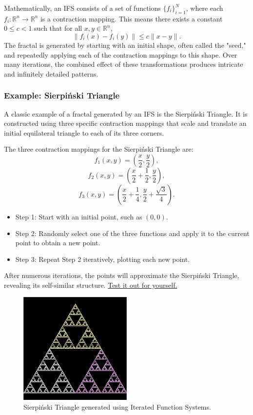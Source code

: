 \documentclass[12pt]{article}
\begin{document}
Mathematically, an IFS consists of a set of functions \( \{f_i\}_{i=1}^N \), where each \( f_i: \mathbb{R}^n \to \mathbb{R}^n \) is a contraction mapping. This means there exists a constant \( 0 \leq c < 1 \) such that for all \( x, y \in \mathbb{R}^n \),
\[
\| f_i(x) - f_i(y) \| \leq c \| x - y \|.
\]
The fractal is generated by starting with an initial shape, often called the "seed," and repeatedly applying each of the contraction mappings to this shape. Over many iterations, the combined effect of these transformations produces intricate and infinitely detailed patterns.

\subsubsection{Example: Sierpiński Triangle}
A classic example of a fractal generated by an IFS is the Sierpiński Triangle. It is constructed using three specific contraction mappings that scale and translate an initial equilateral triangle to each of its three corners.

The three contraction mappings for the Sierpiński Triangle are:
\[
f_1(x, y) = \left( \frac{x}{2}, \frac{y}{2} \right),
\]
\[
f_2(x, y) = \left( \frac{x}{2} + \frac{1}{2}, \frac{y}{2} \right),
\]
\[
f_3(x, y) = \left( \frac{x}{2} + \frac{1}{4}, \frac{y}{2} + \frac{\sqrt{3}}{4} \right).
\]

\begin{itemize}
    \item Step 1: Start with an initial point, such as \( (0,0) \).
    \item Step 2: Randomly select one of the three functions and apply it to the current point to obtain a new point.
    \item Step 3: Repeat Step 2 iteratively, plotting each new point.
\end{itemize}

After numerous iterations, the points will approximate the Sierpiński Triangle, revealing its self-similar structure. \href{https://cs.lmu.edu/~ray/notes/ifs/}{Test it out for yourself.}

\begin{figure}[H]
\centering
\includegraphics[width=0.5\textwidth]{assets/sierpinski-triangle.png}
\caption{Sierpiński Triangle generated using Iterated Function Systems.}
\label{fig:sierpinski}
\end{figure}
\end{document}
